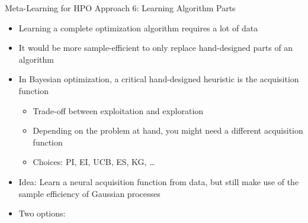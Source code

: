 \begin{frame}[c]{Meta-Learning for HPO Approach 6: Learning Algorithm Parts}

\begin{itemize}
	\item Learning a complete optimization algorithm  \alert{requires a lot of data}
	\item It would be more \alert{sample-efficient} to \alert{only replace hand-designed parts} of an algorithm

\bigskip
\pause
	\item In Bayesian optimization, a critical hand-designed heuristic is the acquisition function
	\begin{itemize}
		\item Trade-off between exploitation and exploration
		\item Depending on the problem at hand, you might need a different acquisition function
		\item Choices: PI, EI, UCB, ES, KG, \dots 
	\end{itemize}
\pause
\bigskip

    \item \alert{Idea:} Learn a \alert{neural acquisition function} from data, but still make use of the sample efficiency of Gaussian processes 

\pause
\medskip
    \item Two options:

\end{itemize}


\end{frame}

